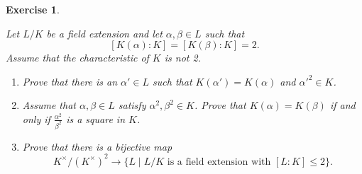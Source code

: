 \documentclass[a4paper,10pt,reqno]{amsart}
\newtheorem{ex}{Exercise}[section]
\begin{document}
\begin{ex}
\label{2.1}

    Let $L/K$ be a field extension and let $\alpha, \beta\in L$ such that 
    \[
    [K(\alpha):K]=[K(\beta):K]=2.
    \]
    Assume that the characteristic of $K$ is not 2.
    \begin{enumerate}[label=(\roman*)]
    \item Prove that there is an $\alpha' \in L$ such that $K(\alpha') = K(\alpha)$ and $\alpha'^2 \in K$.
    \item Assume that $\alpha,\beta \in L$ satisfy $\alpha^2,\beta^2 \in K$. Prove that $K(\alpha)=K(\beta)$ if and only if $\frac{\alpha^2}{\beta^2}$ is a square in $K$.
    \item Prove that there is a bijective map 
    \[
    K^\times/(K^\times)^2\longrightarrow \{L\mid L/K \text{ is a field extension with } [L:K] \leq 2\}.
    \]
\end{enumerate}    
\end{ex}
\end{document}
